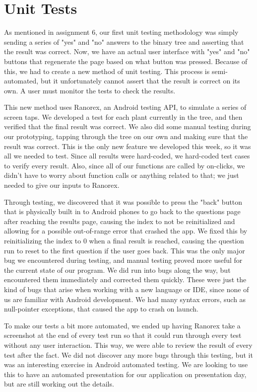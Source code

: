 \documentclass[a4paper]{article}
\begin{document}
\pagebreak
\section{Unit Tests}
As mentioned in assignment 6, our first unit testing methodology was simply sending a series of "yes" and "no" answers to the binary tree and asserting that the result was correct. Now, we have an actual user interface with "yes" and "no" buttons that regenerate the page based on what button was pressed. Because of this, we had to create a new method of unit testing. This process is semi-automated, but it unfortunately cannot assert that the result is correct on its own. A user must monitor the tests to check the results.

This new method uses Ranorex, an Android testing API, to simulate a series of screen taps. We developed a test for each plant currently in the tree, and then verified that the final result was correct. We also did some manual testing during our prototyping, tapping through the tree on our own and making sure that the result was correct. This is the only new feature we developed this week, so it was all we needed to test. Since all results were hard-coded, we hard-coded test cases to verify every result. Also, since all of our functions are called by on-clicks, we didn't have to worry about function calls or anything related to that; we just needed to give our inputs to Ranorex. 

Through testing, we discovered that it was possible to press the "back" button that is physically built in to Android phones to go back to the questions page after reaching the results page, causing the index to not be reinitialized and allowing for a possible out-of-range error that crashed the app. We fixed this by reinitializing the index to 0 when a final result is reached, causing the question run to reset to the first question if the user goes back. This was the only major bug we encountered during testing, and manual testing proved more useful for the current state of our program. We did run into bugs along the way, but encountered them immediately and corrected them quickly. These were just the kind of bugs that arise when working with a new language or IDE, since none of us are familiar with Android development. We had many syntax errors, such as null-pointer exceptions, that caused the app to crash on launch.

To make our tests a bit more automated, we ended up having Ranorex take a screenshot at the end of every test run so that it could run through every test without any user interaction. This way, we were able to review the result of every test after the fact. We did not discover any more bugs through this testing, but it was an interesting exercise in Android automated testing. We are looking to use this to have an automated presentation for our application on presentation day, but are still working out the details.
\end{document}
